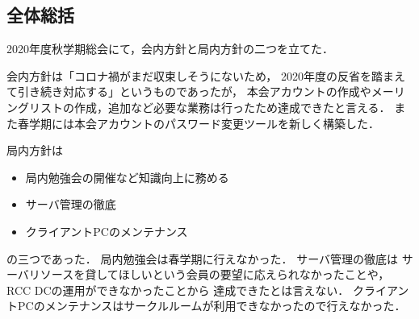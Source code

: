 \subsection*{全体総括}


2020年度秋学期総会にて，会内方針と局内方針の二つを立てた．

会内方針は「コロナ禍がまだ収束しそうにないため，
2020年度の反省を踏まえて引き続き対応する」というものであったが，
本会アカウントの作成やメーリングリストの作成，追加など必要な業務は行ったため達成できたと言える．
また春学期には本会アカウントのパスワード変更ツールを新しく構築した．

局内方針は
\begin{itemize}
  \item 局内勉強会の開催など知識向上に務める
  \item サーバ管理の徹底
  \item クライアントPCのメンテナンス
\end{itemize}
の三つであった．
局内勉強会は春学期に行えなかった．
サーバ管理の徹底は
サーバリソースを貸してほしいという会員の要望に応えられなかったことや，RCC DCの運用ができなかったことから
達成できたとは言えない．
クライアントPCのメンテナンスはサークルルームが利用できなかったので行えなかった．